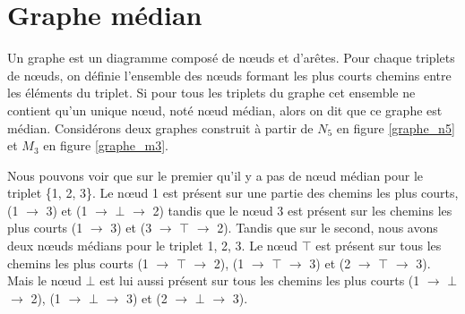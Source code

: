 \section{Graphe médian}

Un graphe est un diagramme composé de n\oe uds et d'arêtes. Pour chaque triplets de n\oe uds, on définie l'ensemble des n\oe uds formant les plus courts chemins entre les éléments du triplet. Si pour tous les triplets du graphe cet ensemble ne contient qu'un unique n\oe ud, noté n\oe ud médian, alors on dit que ce graphe est médian. Considérons deux graphes construit à partir de $N_5$ en figure \ref{graphe_n5} et $M_3$ en figure \ref{graphe_m3}.

\smallbreak

Nous pouvons voir que sur le premier qu'il y a pas de n\oe ud médian pour le triplet \{1, 2, 3\}. Le n\oe ud 1 est présent sur une partie des chemins les plus courts, (1 $\rightarrow$ 3) et (1 $\rightarrow$ $\bot$ $\rightarrow$ 2) tandis que le n\oe ud 3 est présent sur les chemins les plus courts (1 $\rightarrow$ 3) et (3 $\rightarrow$ $\top$ $\rightarrow$ 2). Tandis que sur le second, nous avons deux n\oe uds médians pour le triplet {1, 2, 3}. Le n\oe ud $\top$ est présent sur tous les chemins les plus courts (1 $\rightarrow$ $\top$ $\rightarrow$ 2), (1 $\rightarrow$ $\top$ $\rightarrow$ 3) et (2 $\rightarrow$ $\top$ $\rightarrow$ 3). Mais le n\oe ud $\bot$ est lui aussi présent sur tous les chemins les plus courts (1 $\rightarrow$ $\bot$ $\rightarrow$ 2), (1 $\rightarrow$ $\bot$ $\rightarrow$ 3) et (2 $\rightarrow$ $\bot$ $\rightarrow$ 3).

